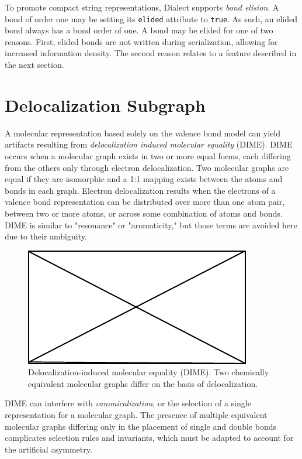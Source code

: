 \documentclass{article}
\def\ttt{\texttt}
\begin{document}
To promote compact string representations, Dialect supports \textit{bond elision}. A bond of order one may be setting its \ttt{elided} attribute to \ttt{true}. As such, an elided bond always has a bond order of one. A bond may be elided for one of two reasons. First, elided bonds are not written during serialization, allowing for increased information density. The second reason relates to a feature described in the next section.

\section*{Delocalization Subgraph}

A molecular representation based solely on the valence bond model can yield artifacts resulting from \textit{delocalization induced molecular equality} (DIME). DIME occurs when a molecular graph exists in two or more equal forms, each differing from the others only through electron delocalization. Two molecular graphs are equal if they are isomorphic and a 1:1 mapping exists between the atoms and bonds in each graph. Electron delocalization results when the electrons of a valence bond representation can be distributed over more than one atom pair, between two or more atoms, or across some combination of atoms and bonds. DIME is similar to "resonance" or "aromaticity," but those terms are avoided here due to their ambiguity.\cite{randic:2018,kerber:2006}

\begin{figure}
    \centering
    \includegraphics{filler}
    \caption{Delocalization-induced molecular equality (DIME). Two chemically equivalent molecular graphs differ on the basis of delocalization.}
    \label{fig:dime}
\end{figure}

DIME can interfere with \textit{canonicalization}, or the selection of a single representation for a molecular graph. The presence of multiple equivalent molecular graphs differing only in the placement of single and double bonds complicates selection rules and invariants, which must be adapted to account for the artificial asymmetry.
\end{document}
